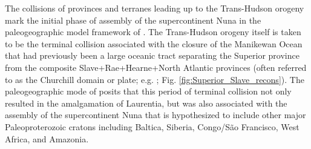 \documentclass[11pt,letterpaper]{article}
\begin{document}
The collisions of provinces and terranes leading up to the Trans-Hudson orogeny mark the initial phase of assembly of the supercontinent Nuna in the paleogeographic model framework of \cite{Pehrsson2015a}. The Trans-Hudson orogeny itself is taken to be the terminal collision associated with the closure of the Manikewan Ocean that had previously been a large oceanic tract separating the Superior province from the composite Slave+Rae+Hearne+North Atlantic provinces (often referred to as the Churchill domain or plate; e.g. \citealp{Skipton2016a, Weller2017a}; Fig. \ref{fig:Superior_Slave_recons}). The paleogeographic mode of \cite{Pehrsson2015a} posits that this period of terminal collision not only resulted in the amalgamation of Laurentia, but was also associated with the assembly of the supercontinent Nuna that is hypothesized to include other major Paleoproterozoic cratons including Baltica, Siberia, Congo/S\~ao Francisco, West Africa, and Amazonia.
\end{document}
